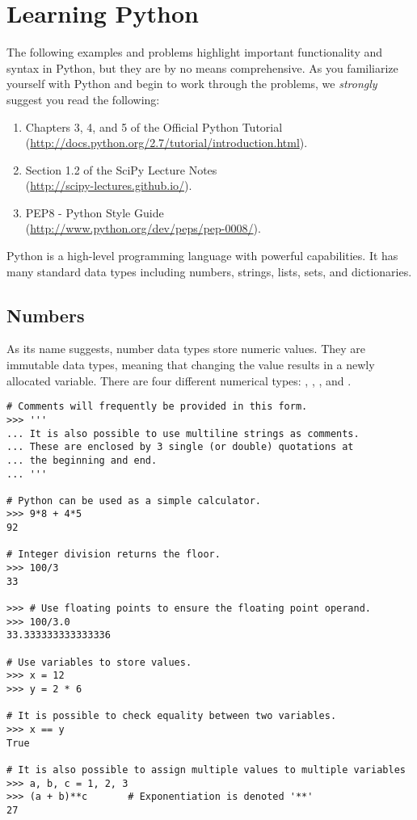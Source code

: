 \section*{Learning Python}
The following examples and problems highlight important functionality and syntax in Python, but they are by no means comprehensive.  As you familiarize yourself with Python and begin to work through the problems, we \emph{strongly} suggest you read the following:
\begin{enumerate}
\item Chapters 3, 4, and 5 of the Official Python Tutorial \\
        (\url{http://docs.python.org/2.7/tutorial/introduction.html}).
\item Section 1.2 of the SciPy Lecture Notes \\
        (\url{http://scipy-lectures.github.io/}).
\item PEP8 - Python Style Guide \\
        (\url{http://www.python.org/dev/peps/pep-0008/}).
\end{enumerate}

Python is a high-level programming language with powerful capabilities. 
It has many standard data types including numbers, strings, lists, sets, and dictionaries. 

\subsection*{Numbers}
\begin{example}
As its name suggests, number data types store numeric values. 
They are immutable data types, meaning that changing the value results in a 
newly allocated variable.
There are four different numerical types: , , 
, and .

\begin{lstlisting}
# Comments will frequently be provided in this form.
>>> '''
... It is also possible to use multiline strings as comments. 
... These are enclosed by 3 single (or double) quotations at 
... the beginning and end. 
... '''

# Python can be used as a simple calculator.
>>> 9*8 + 4*5
92

# Integer division returns the floor.
>>> 100/3
33

>>> # Use floating points to ensure the floating point operand.
>>> 100/3.0
33.333333333333336

# Use variables to store values.
>>> x = 12
>>> y = 2 * 6

# It is possible to check equality between two variables.
>>> x == y
True

# It is also possible to assign multiple values to multiple variables
>>> a, b, c = 1, 2, 3
>>> (a + b)**c       # Exponentiation is denoted '**'
27
\end{lstlisting}
\end{example}

